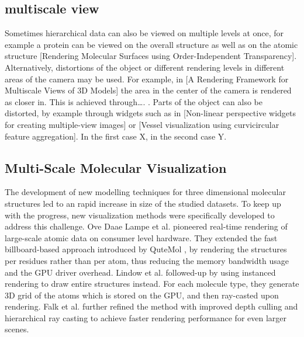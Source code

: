 \documentclass[review,journal]{vgtc}         %
\begin{document}
\subsection{multiscale view}
Sometimes hierarchical data can also be viewed on multiple levels at once, for example a protein can be viewed on the overall structure as well as on the atomic structure [Rendering Molecular Surfaces using Order-Independent Transparency]. 
Alternatively, distortions of the object or different rendering levels in different areas of the camera may be used. 
For example, in [A Rendering Framework for Multiscale Views of 3D Models] the area in the center of the camera is rendered as closer in. 
This is achieved through…. . Parts of the object can also be distorted, by example through widgets such as in [Non-linear perspective widgets for creating multiple-view images] or [Vessel visualization using curvicircular feature aggregation]. 
In the first case X, in the second case Y.

\subsection{Multi-Scale Molecular Visualization}

The development of new modelling techniques for three dimensional molecular structures led to an rapid increase in size of the studied datasets.
To keep up with the progress, new visualization methods were specifically developed to address this challenge.
Ove Daae Lampe et al.\cite{lampe2007two} pioneered real-time rendering of large-scale atomic data on consumer level hardware. 
They extended the fast billboard-based approach introduced by QuteMol \cite{tarini2006ambient}, by rendering the structures per residues rather than per atom, thus reducing the memory bandwidth usage and the GPU driver overhead. 
Lindow et al. \cite{lindow2012interactive} followed-up by using  instanced rendering to draw entire structures instead.
For each molecule type, they generate 3D grid of the atoms which is stored on the GPU, and then ray-casted upon rendering.
Falk et al. \cite{falk2013atomistic} further refined the method with improved depth culling and hierarchical ray casting to achieve faster rendering performance for even larger scenes. 

\end{document}
